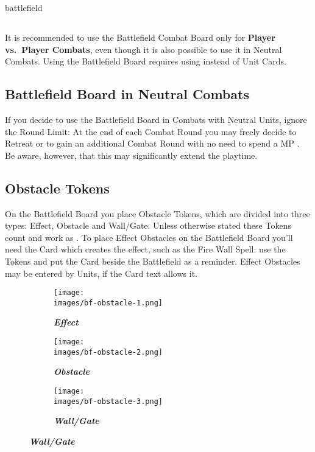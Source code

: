 \pagebreak
\begin{expansion}{battlefield}
  \begin{multicols*}{2}
  \subsection*{}
  It is recommended to use the Battlefield Combat Board only for \textbf{Player vs.~Player Combats}, even though it is also possible to use it in Neutral Combats.
  Using the Battlefield Board requires using  instead of Unit Cards.

  \medskip
  \subsection*{Battlefield Board in Neutral Combats}
  If you decide to use the Battlefield Board in Combats with Neutral Units, ignore the Round Limit:
  At the end of each Combat Round you may freely decide to Retreat or to gain an additional Combat Round with no need to spend a MP .
  Be aware, however, that this may significantly extend the playtime.

  \medskip
  \subsection*{Obstacle Tokens}
  On the Battlefield Board you place Obstacle Tokens, which are divided into three types:
  Effect, Obstacle and Wall/Gate.
  Unless otherwise stated these Tokens count and work as .
  To place Effect Obstacles on the Battlefield Board you'll need the Card which creates the effect, such as the Fire Wall Spell: use the Tokens and put the Card beside the Battlefield as a reminder.
  Effect Obstacles may be entered by Units, if the Card text allows it.
  \vspace*{1em}
  \begin{figure}[H]
    \centering
    \begin{subfigure}[b]{0.3\linewidth}
      \centering
      \texttt{[image: \\images/bf-obstacle-1.png]}
      \caption{\textbf{\textit{\textcolor{darkcandyapplered}{Effect}}}}
    \end{subfigure}
    \begin{subfigure}[b]{0.3\linewidth}
      \centering
      \texttt{[image: \\images/bf-obstacle-2.png]}
      \caption{\textbf{\textit{\textcolor{darkcandyapplered}{Obstacle}}}}
    \end{subfigure}
    \begin{subfigure}[b]{0.3\linewidth}
      \centering
      \texttt{[image: \\images/bf-obstacle-3.png]}
      \caption{\textbf{\textit{\textcolor{darkcandyapplered}{Wall/Gate}}}}
    \end{subfigure}
  \end{figure}
  \vspace*{1em}
  \columnbreak


\end{multicols*}
\end{expansion}

